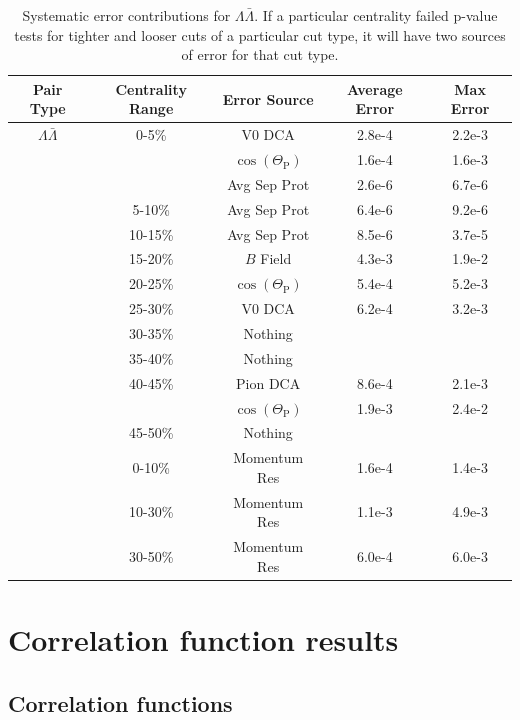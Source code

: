 \begin{table}
\caption[Systematic error contributions for $\Lambda\bar{\Lambda}$] {Systematic error contributions for $\Lambda\bar{\Lambda}$.  If a particular centrality failed p-value tests for tighter and looser cuts of a particular cut type, it will have two sources of error for that cut type.} \label{tab:SysErrorSourcesLA} 
\begin{center}
\begin{tabular}{| c | c | c | c | c |}
  \hline                        
  Pair Type & Centrality Range & Error Source & Average Error & Max Error \\
  \hline  
  $\Lambda\bar{\Lambda}$ &  0-5\% & V0 DCA & 2.8e-4 & 2.2e-3 \\
   &         & $\cos(\Theta_{\mathrm{P}})$ & 1.6e-4 & 1.6e-3 \\
   &         & Avg Sep Prot & 2.6e-6 & 6.7e-6 \\
   & 5-10\%  & Avg Sep Prot & 6.4e-6 & 9.2e-6 \\
   & 10-15\% & Avg Sep Prot & 8.5e-6 & 3.7e-5 \\
   & 15-20\% & $B$ Field & 4.3e-3 & 1.9e-2 \\
   & 20-25\% & $\cos(\Theta_{\mathrm{P}})$ & 5.4e-4 & 5.2e-3 \\
   & 25-30\% & V0 DCA & 6.2e-4 & 3.2e-3 \\
   & 30-35\% & Nothing & &  \\
   & 35-40\% & Nothing & &  \\
   & 40-45\% & Pion DCA & 8.6e-4 & 2.1e-3  \\
   &         & $\cos(\Theta_{\mathrm{P}})$ & 1.9e-3 & 2.4e-2 \\
   & 45-50\% & Nothing & &  \\
   & 0-10\%  & Momentum Res & 1.6e-4 & 1.4e-3 \\
   & 10-30\% & Momentum Res & 1.1e-3 & 4.9e-3 \\
   & 30-50\% & Momentum Res & 6.0e-4 & 6.0e-3 \\
  \hline  
\end{tabular}
\end{center}
\end{table}

\section{Correlation function results}
\subsection{Correlation functions}
\label{sec:CorrelationFunctions}

